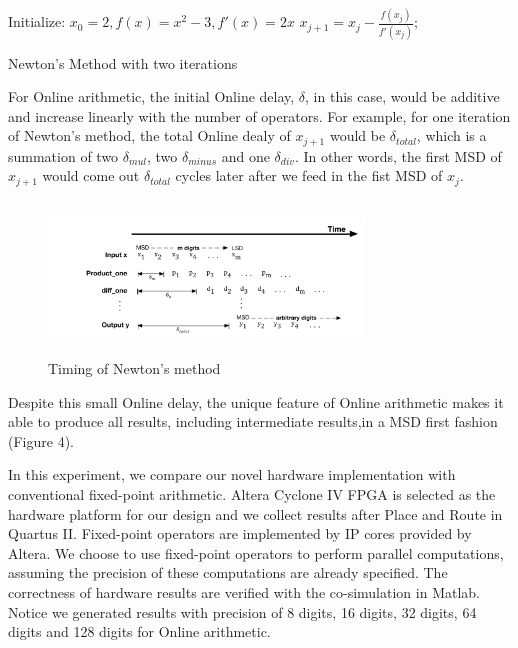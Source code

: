 \documentclass{sig-alternate}
\begin{document}
  	\begin{algorithm}
  		\begin{algorithmic}[1]
  			\State Initialize: $x_{0}=2, f(x)=x^{2}-3, f'(x)=2x$	
  			\State $x_{j+1}=x_{j}-\frac{f(x_j)}{f'(x_j)};$
  			\EndFor
  		\end{algorithmic}
  		\caption{Newton's Method with two iterations}
  		\label{alg:algorithm3}
  	\end{algorithm}
For Online arithmetic, the initial Online delay, $\delta$, in this case, would be additive and increase linearly with the number of operators. For example, for one iteration of Newton's method, the total Online dealy of $x_{j+1}$ would be $\delta_{total}$, which is a summation of two $\delta_{mul}$, two $\delta_{minus}$ and one $\delta_{div}$. In other words, the first MSD of $x_{j+1}$ would come out $\delta_{total}$ cycles later after we feed in the fist MSD of $x_{j}$.\newpage
\begin{figure} [ht]
	\centering
	\includegraphics[width=3.3in,height=1.6in]{newton_timing}
	\caption{Timing of Newton's method}
\end{figure}
\vspace{-12pt}

Despite this small Online delay, the unique feature of Online arithmetic makes it able to produce all results, including intermediate results,in a MSD first fashion (Figure 4). 

In this experiment, we compare our novel hardware implementation with conventional fixed-point arithmetic.
Altera Cyclone IV FPGA is selected as the hardware platform for our design and we collect results after Place and Route in Quartus II.   
Fixed-point operators are implemented by IP cores provided by Altera. We choose to use fixed-point operators to perform parallel computations, assuming the precision of these computations are already specified. The correctness of hardware results are verified with the co-simulation in Matlab. Notice we generated results with precision of 8 digits, 16 digits, 32 digits, 64 digits and 128 digits for Online arithmetic. 
\end{document}
